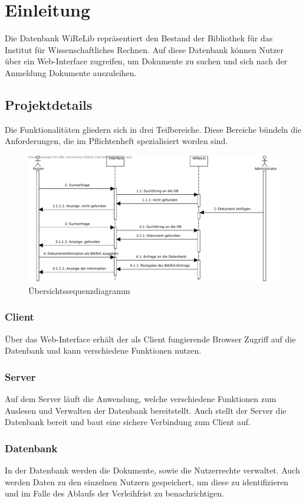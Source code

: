 
\chapter{Einleitung}
Die Datenbank WiReLib repräsentiert den Bestand der Bibliothek für das Institut für Wissenschaftliches Rechnen.
Auf diese Datenbank können Nutzer über ein Web-Interface zugreifen, um Dokumente zu suchen und sich nach der Anmeldung Dokumente auszuleihen.

\section{Projektdetails}
Die Funktionalitäten gliedern sich in drei Teilbereiche.
Diese Bereiche bündeln die Anforderungen, die im Pflichtenheft spezialisiert
worden sind.

\begin{figure}[h]
\includegraphics[width=0.8\linewidth]{bilder/Seq-Uebersicht.pdf}
\caption[Übersichtssequenzdiagramm]{Übersichtssequenzdiagramm}
\label{fig:Seqü}
\end{figure}

\subsection{Client}
Über das Web-Interface erhält der als Client fungierende Browser Zugriff auf die Datenbank und kann verschiedene Funktionen nutzen.

\subsection{Server}
Auf dem Server läuft die Anwendung, welche verschiedene Funktionen zum Auslesen und Verwalten der Datenbank bereitstellt. 
Auch stellt der Server die Datenbank bereit und baut eine sichere Verbindung zum Client auf.

\subsection{Datenbank}
In der Datenbank werden die Dokumente, sowie die Nutzerrechte verwaltet.
Auch werden Daten zu den einzelnen Nutzern gespeichert, um diese zu identifizieren und im Falle des Ablaufs der Verleihfrist zu benachrichtigen.
